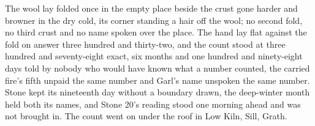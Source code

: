 The wool lay folded once in the empty place beside the crust gone harder and browner in the dry cold, its corner standing a hair off the wool; no second fold, no third crust and no name spoken over the place. The hand lay flat against the fold on answer three hundred and thirty-two, and the count stood at three hundred and seventy-eight exact, six months and one hundred and ninety-eight days told by nobody who would have known what a number counted, the carried fire's fifth unpaid the same number and Garl's name unspoken the same number. Stone kept its nineteenth day without a boundary drawn, the deep-winter month held both its names, and Stone 20's reading stood one morning ahead and was not brought in. The count went on under the roof in Low Kiln, Sill, Grath.
